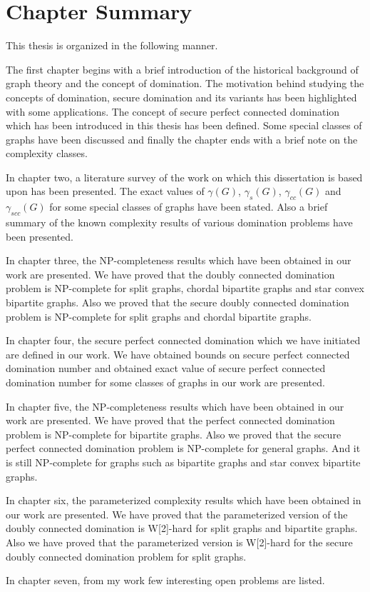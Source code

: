\section{Chapter Summary}
\noindent
This thesis is organized in the following manner. \par 
The first chapter begins with a brief introduction of the historical background of graph theory and the concept of domination. The motivation behind studying the concepts of domination, secure domination and its variants has been highlighted with some applications. The concept of secure perfect connected domination which has been introduced in this thesis has been defined. Some special classes of graphs have been discussed and finally the chapter ends with a brief note on the complexity classes. \par
In chapter two, a literature survey of the work on which this dissertation is based upon has been presented. The exact values of $\gamma(G)$, $\gamma_s(G)$, $\gamma_{cc}(G)$ and $\gamma_{scc}(G)$ for some special classes of graphs have been stated. Also a brief summary of the known complexity results of various domination problems have been presented. \par 
In chapter three, the NP-completeness results which have been obtained in our work are presented. We have proved that the doubly connected domination problem is NP-complete for split graphs, chordal bipartite graphs and star convex bipartite graphs. Also we proved that the secure doubly connected domination problem is NP-complete for split graphs and chordal bipartite graphs. \par 
In chapter four, the secure perfect connected domination which we have initiated are defined in our work. We have obtained bounds on secure perfect connected domination number and obtained exact value of secure perfect connected domination number for some classes of graphs in our work are presented.\par
In chapter five, the NP-completeness results which have been obtained in our work are presented. We have proved that the perfect connected domination problem is NP-complete for bipartite graphs. Also we proved that the secure perfect connected domination problem is NP-complete for general graphs. And it is still NP-complete for graphs such as bipartite graphs and star convex bipartite graphs. \par 
In chapter six, the parameterized complexity results which have been obtained in our work are presented. We have proved that the parameterized version of the doubly connected domination is W[2]-hard for split graphs and bipartite graphs. Also we have proved that the parameterized version is W[2]-hard for the secure doubly connected domination problem for split graphs. \par 
In chapter seven, from my work few interesting open problems are listed. 
